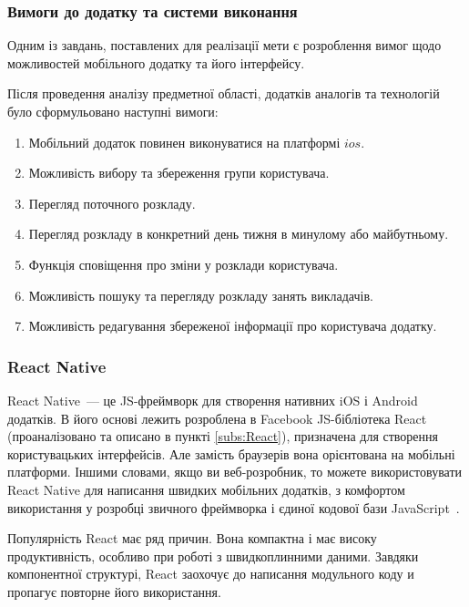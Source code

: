 \subsubsection{Вимоги до додатку та системи виконання}

Одним із завдань, поставлених для реалізації мети є розроблення вимог щодо можливостей мобільного додатку та його інтерфейсу.

Після проведення аналізу предметної області, додатків аналогів та технологій було сформульовано наступні вимоги:

\begin{enumerate}
    \item Мобільний додаток повинен виконуватися на платформі $ios$.
    \item Можливість вибору та збереження групи користувача.
    \item Перегляд поточного розкладу.
    \item Перегляд розкладу в конкретний день тижня в минулому або майбутньому. 
    \item Функція сповіщення про зміни у розклади користувача.
    \item Можливість пошуку та перегляду розкладу занять викладачів.
    \item Можливість редагування збереженої інформації про користувача додатку.
\end{enumerate}

\subsubsection{React Native}


React Native~--- це JS-фреймворк для створення нативних iOS і Android додатків. В його основі лежить розроблена в Facebook JS-бібліотека React (проаналізовано та описано в пункті \ref{subs:React}), призначена для створення користувацьких інтерфейсів. Але замість браузерів вона орієнтована на мобільні платформи. Іншими словами, якщо ви веб-розробник, то можете використовувати React Native для написання  швидких мобільних додатків, з комфортом використання у розробці звичного фреймворка і єдиної кодової бази JavaScript~\cite{jeffgothelf2016}.

Популярність React має ряд причин. Вона компактна і має високу продуктивність, особливо при роботі з швидкоплинними даними. Завдяки компонентної структурі, React заохочує до написання модульного коду и пропагує повторне його використання.

